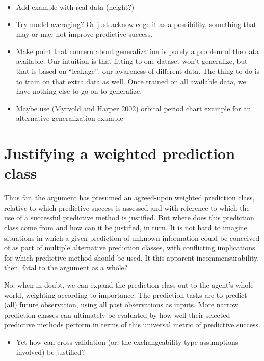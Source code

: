 \documentclass[
  letterpaper,
  DIV=11,
  numbers=noendperiod]{scrartcl}
\providecommand{\tightlist}{%
  \setlength{\itemsep}{0pt}\setlength{\parskip}{0pt}}
\theoremstyle{definition}
\theoremstyle{remark}
\begin{document}
\begin{itemize}
\tightlist
\item
  Add example with real data (height?)
\item
  Try model averaging? Or just acknowledge it as a possibility,
  something that may or may not improve predictive success.
\item
  Make point that concern about generalization is purely a problem of
  the data available. Our intuition is that fitting to one dataset won't
  generalize, but that is based on ``leakage'': our awareness of
  different data. The thing to do is to train on that extra data as
  well. Once trained on all available data, we have nothing else to go
  on to generalize.
\item
  Maybe use (Myrvold and Harper 2002) orbital period chart example for
  an alternative generalization example
\end{itemize}

\section{Justifying a weighted prediction class}\label{sec-class}

Thus far, the argument has presumed an agreed-upon weighted prediction
class, relative to which predictive success is assessed and with
reference to which the use of a successful predictive method is
justified. But where does this prediction class come from and how can it
be justified, in turn. It is not hard to imagine situations in which a
given prediction of unknown information could be conceived of as part of
multiple alternative prediction classes, with conflicting implications
for which predictive method should be used. It this apparent
incommensurability, then, fatal to the argument as a whole?

No, when in doubt, we can expand the prediction class out to the agent's
whole world, weighting according to importance. The prediction tasks are
to predict (all) future observation, using all past observations as
inputs. More narrow prediction classes can ultimately be evaluated by
how well their selected predictive methods perform in terms of this
universal metric of predictive success.

\begin{itemize}
\tightlist
\item
  Yet how can cross-validation (or, the exchangeability-type assumptions
  involved) be justified?
\end{itemize}
\end{document}
